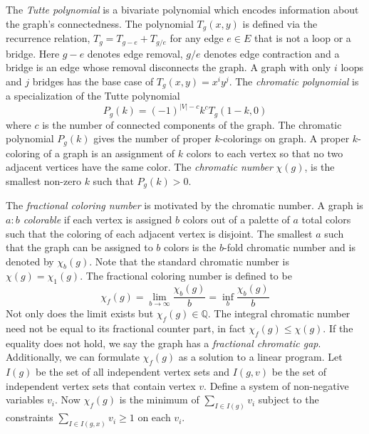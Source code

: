 \documentclass[12pt]{article}
\newcommand{\VARchromatic}{\chi}
\newcommand{\VARchromaticpolynomial}[1]{P_g(#1)}
\newcommand{\VARfractionalchromaticnumber}[1]{\VARchromatic_{#1}(g)}
\newcommand{\VARchromaticnumber}{\VARchromatic(g)}
\begin{document}
\begin{appendices}
The \textit{Tutte polynomial} is a bivariate polynomial which encodes information about the graph's connectedness.
The polynomial $T_g(x,y)$ is defined via the recurrence relation, $T_g = T_{g-e} + T_{g/e}$ for any edge $e \in E$ that is not a loop or a bridge. 
Here $g-e$ denotes edge removal, $g / e$ denotes edge contraction and a bridge is an edge whose removal disconnects the graph.
A graph with only $i$ loops and $j$ bridges has the base case of $T_g(x,y) = x^i y^j$.
%
The \textit{chromatic polynomial} is a specialization of the Tutte polynomial 
\begin{equation}
\VARchromaticpolynomial{k} = (-1)^{|V|-c}k^{c}T_g(1-k,0)
\end{equation}
where $c$ is the number of connected components of the graph.
The chromatic polynomial $\VARchromaticpolynomial{k}$ gives the number of proper $k$-colorings on graph. 
A proper $k$-coloring of a graph is an assignment of $k$ colors to each vertex so that no two adjacent vertices have the same color. 
The \textit{chromatic number} $\VARchromaticnumber$, is the smallest non-zero $k$ such that $\VARchromaticpolynomial{k}>0$.

The \textit{fractional coloring number} is motivated by the chromatic number.
A graph is \textit{$a:b$ colorable} if each vertex is assigned $b$ colors out of a palette of $a$ total colors such that the coloring of each adjacent vertex is disjoint. 
The smallest $a$ such that the graph can be assigned to $b$ colors is the $b$-fold chromatic number and is denoted by $\VARfractionalchromaticnumber{b}$. 
Note that the standard chromatic number is $\VARchromaticnumber{} = \VARfractionalchromaticnumber{1}$.
The fractional coloring number is defined to be
\begin{equation}
\VARfractionalchromaticnumber{f} = 
\lim_{b \rightarrow \infty} \frac{\VARfractionalchromaticnumber{b}}{b} = 
\inf _ {b} \frac{\VARfractionalchromaticnumber{b}}{b} 
\end{equation}
Not only does the limit exists but $\VARfractionalchromaticnumber{f} \in \mathbb{Q}$\cite{scheinerman2011fractional}.
The integral chromatic number need not be equal to its fractional counter part, in fact 
$\VARfractionalchromaticnumber{f} \le \VARchromaticnumber$.
If the equality does not hold, we say the graph has a \textit{fractional chromatic gap}.
Additionally, we can formulate $\VARfractionalchromaticnumber{f}$ as a solution to a linear program.
Let $I(g)$ be the set of all independent vertex sets and $I(g,v)$ be the set of independent vertex sets that contain vertex $v$. 
Define a system of non-negative variables $v_i$.
Now $\VARfractionalchromaticnumber{f}$ is the minimum of $\sum_{I \in I(g)} v_i$ subject to the constraints $\sum_{I \in I(g,x)} v_i \ge 1$ on each $v_i$.


\end{appendices}
\end{document}
